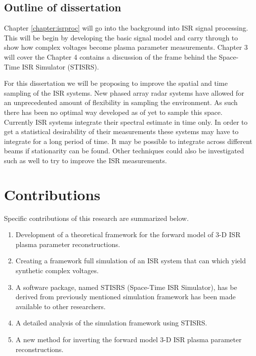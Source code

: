 \subsection{Outline of dissertation}

Chapter \ref{chapter:isrproc} will go into the background into ISR signal processing. This will be begin by developing the basic signal model and carry through to show how complex voltages become plasma parameter measurements.
Chapter 3 will cover the 
Chapter 4 contains a discussion of the frame behind the Space-Time ISR Simulator (STISRS).

For this dissertation we will be proposing to improve the spatial and time sampling of the ISR systems.  New phased array radar systems have allowed for an unprecedented amount of flexibility in sampling the environment.  As such there has been no optimal way developed as of yet to sample this space.  Currently ISR systems integrate their spectral estimate in time only.  In order to get a statistical desirability of their measurements these systems may have to integrate for a long period of time.  It may be possible to integrate across different beams if stationarity can be found.  Other techniques could also be investigated such as well to try to improve the ISR measurements.

\section{Contributions}
Specific contributions of this research are summarized below.

\begin{enumerate}
\item Development of a theoretical framework for the forward model of 3-D ISR plasma parameter reconstructions.
\item Creating a framework full simulation of an ISR system that can which yield synthetic complex voltages.
\item A software package, named STISRS (Space-Time ISR Simulator), has be derived from previously mentioned simulation framework has been made available to other researchers.
\item A detailed analysis of the simulation framework using STISRS.
\item A new method for inverting the forward model 3-D ISR plasma parameter reconstructions.
\end{enumerate}